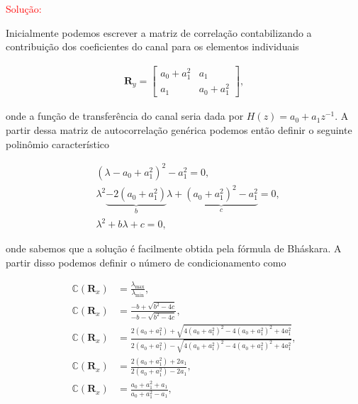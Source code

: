 \begin{enumerate}
        \textcolor{red}{Solução:}
        
        Inicialmente podemos escrever a matriz de correlação contabilizando a contribuição dos coeficientes do canal para os elementos individuais
        
        \begin{align}
            \mathbf{R}_{y} =
            \begin{bmatrix}
                a_{0} + a^{2}_{1} & a_{1}\\
                a_{1} & a_{0} + a^{2}_{1}
            \end{bmatrix},
        \end{align}

        onde a função de transferência do canal seria dada por $H(z) = a_{0} + a_{1}z^{-1}$. A partir dessa matriz de autocorrelação genérica podemos então 
        definir o seguinte polinômio característico

        \begin{align}
            &(\lambda - a_{0} + a^{2}_{1})^{2} - a^{2}_{1} = 0, \\
            &\lambda^{2} \underbrace{- 2 (a_{0} + a^{2}_{1})}_{b} \lambda + \underbrace{(a_{0} + a^{2}_{1})^{2} - a^{2}_{1}}_{c} = 0, \\
            &\lambda^{2} + b \lambda + c = 0,
        \end{align}

        onde sabemos que a solução é facilmente obtida pela fórmula de Bháskara. A partir disso podemos definir o número de condicionamento como

        \begin{align}
            \mathbb{C} (\mathbf{R}_{x}) &= \frac{\lambda_{\text{max}}}{\lambda_{\text{min}}}, \\
            \mathbb{C} (\mathbf{R}_{x}) &= \frac{- b + \sqrt{b^{2} - 4c}}{- b - \sqrt{b^{2} - 4c}}, \\
            \mathbb{C} (\mathbf{R}_{x}) &= \frac{2 (a_{0} + a^{2}_{1}) + \sqrt{4 (a_{0} + a^{2}_{1})^{2} - 4 (a_{0} + a^{2}_{1})^{2} + 4 a^{2}_{1}}}{2 (a_{0} + a^{2}_{1}) - \sqrt{4 (a_{0} + a^{2}_{1})^{2} - 4 (a_{0} + a^{2}_{1})^{2} + 4 a^{2}_{1}}}, \\
            \mathbb{C} (\mathbf{R}_{x}) &= \frac{2 (a_{0} + a^{2}_{1}) + 2a_{1}}{2 (a_{0} + a^{2}_{1}) - 2a_{1}}, \\
            \mathbb{C} (\mathbf{R}_{x}) &= \frac{a_{0} + a^{2}_{1} + a_{1}}{a_{0} + a^{2}_{1} - a_{1}},
        \end{align}


\end{enumerate}
